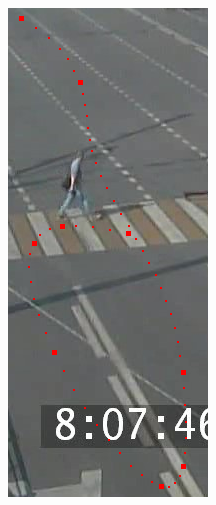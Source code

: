 \begin{figure}[!htb]
\begin{subfigure}[!htb]{0.25\textwidth}
		\includegraphics[width=\textwidth]{images/rdp-n-curve.png}

\end{subfigure}
\end{figure}
